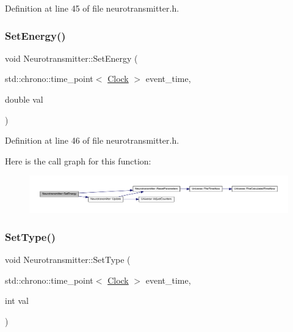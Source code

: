 Definition at line 45 of file neurotransmitter.\+h.

\mbox{\label{class_neurotransmitter_a5ad51ddb1351868e1756e3c41bb88e04}} 
\subsubsection{\texorpdfstring{Set\+Energy()}{SetEnergy()}}
{\footnotesize\ttfamily void Neurotransmitter\+::\+Set\+Energy (\begin{DoxyParamCaption}\item[{std\+::chrono\+::time\+\_\+point$<$ \hyperlink{universe_8h_a0ef8d951d1ca5ab3cfaf7ab4c7a6fd80}{Clock} $>$}]{event\+\_\+time,  }\item[{double}]{val }\end{DoxyParamCaption})\hspace{0.3cm}{\ttfamily [inline]}}



Definition at line 46 of file neurotransmitter.\+h.

Here is the call graph for this function\+:
\nopagebreak
\begin{figure}[H]
\begin{center}
\leavevmode
\includegraphics[width=350pt]{class_neurotransmitter_a5ad51ddb1351868e1756e3c41bb88e04_cgraph}
\end{center}
\end{figure}
\mbox{\label{class_neurotransmitter_ae460ed5fac92ba136a80bba12ebce246}} 
\subsubsection{\texorpdfstring{Set\+Type()}{SetType()}}
{\footnotesize\ttfamily void Neurotransmitter\+::\+Set\+Type (\begin{DoxyParamCaption}\item[{std\+::chrono\+::time\+\_\+point$<$ \hyperlink{universe_8h_a0ef8d951d1ca5ab3cfaf7ab4c7a6fd80}{Clock} $>$}]{event\+\_\+time,  }\item[{int}]{val }\end{DoxyParamCaption})\hspace{0.3cm}{\ttfamily [inline]}}



